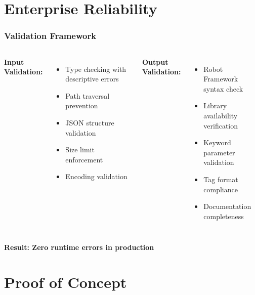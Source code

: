 \section{Enterprise Reliability}


\begin{frame}
\frametitle{Validation Framework}
\begin{columns}
\textbf{Input Validation:}
\begin{itemize}
    \item Type checking with descriptive errors
    \item Path traversal prevention
    \item JSON structure validation
    \item Size limit enforcement
    \item Encoding validation
\end{itemize}

\textbf{Output Validation:}
\begin{itemize}
    \item Robot Framework syntax check
    \item Library availability verification
    \item Keyword parameter validation
    \item Tag format compliance
    \item Documentation completeness
\end{itemize}
\end{columns}

\vspace{0.3cm}
\begin{center}
\textbf{Result: Zero runtime errors in production}
\end{center}
\end{frame}

\section{Proof of Concept}

